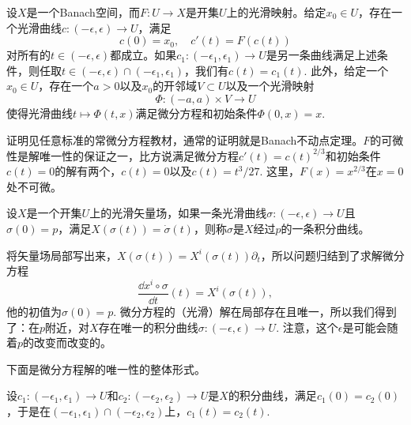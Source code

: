 

\begin{thm}[常微分方程解的存在唯一性]\label{odethm}
设$X$是一个Banach空间，而$F:U\to X$是开集$U$上的光滑映射。给定$x_0\in U$，存在一个光滑曲线$c:(-\epsilon,\epsilon)\to U$，满足
\[
	c(0)=x_0,\quad c'(t)=F(c(t))
\]
对所有的$t\in (-\epsilon,\epsilon)$都成立。如果$c_1:(-\epsilon_1,\epsilon_1)\to U$是另一条曲线满足上述条件，则任取$t\in (-\epsilon,\epsilon)\cap (-\epsilon_1,\epsilon_1)$，我们有$c(t)=c_1(t)$. 此外，给定一个$x_0\in U$，存在一个$a>0$以及$x_0$的开邻域$V\subset U$以及一个光滑映射
\[
	\Phi:(-a,a)\times V\to U
\]
使得光滑曲线$t\mapsto \Phi(t,x)$满足微分方程和初始条件$\Phi(0,x)=x$.
\end{thm}

证明见任意标准的常微分方程教材，通常的证明就是Banach不动点定理。$F$的可微性是解唯一性的保证之一，比方说满足微分方程$c'(t)=c(t)^{2/3}$和初始条件$c(t)=0$的解有两个，$c(t)=0$以及$c(t)=t^3/27$. 这里，$F(x)=x^{2/3}$在$x=0$处不可微。

\begin{para}[积分曲线]
设$X$是一个开集$U$上的光滑矢量场，如果一条光滑曲线$\sigma:(-\epsilon,\epsilon)\to U$且$\sigma(0)=p$，满足$X(\sigma(t))=\dot{\sigma}(t)$，则称$\sigma$是$X$经过$p$的一条积分曲线。

将矢量场局部写出来，$X(\sigma(t))=X^i(\sigma(t))\partial_t$，所以问题归结到了求解微分方程
\[
	\frac{\dd x^i\circ \sigma}{\dd t}(t)=X^i(\sigma(t)),
\]
他的初值为$\sigma(0)=p$. 微分方程的（光滑）解在局部存在且唯一，所以我们得到了：在$p$附近，对$X$存在唯一的积分曲线$\sigma:(-\epsilon,\epsilon)\to U$. 注意，这个$\epsilon$是可能会随着$p$的改变而改变的。
\end{para}

下面是微分方程解的唯一性的整体形式。

\begin{lem}[积分曲线的唯一性]\label{icu}
设$c_1:(-\epsilon_1,\epsilon_1)\to U$和$c_2:(-\epsilon_2,\epsilon_2)\to U$是$X$的积分曲线，满足$c_1(0)=c_2(0)$，于是在$(-\epsilon_1,\epsilon_1)\cap (-\epsilon_2,\epsilon_2)$上，$c_1(t)=c_2(t)$.
\end{lem}

